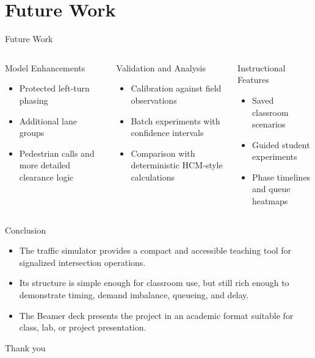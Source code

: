 \documentclass[aspectratio=169]{beamer}
\begin{document}
\section{Future Work}
\begin{frame}{Future Work}
  \begin{columns}[T,totalwidth=\textwidth]
    \begin{block}{Model Enhancements}
      \begin{itemize}
        \item Protected left-turn phasing
        \item Additional lane groups
        \item Pedestrian calls and more detailed clearance logic
      \end{itemize}
    \end{block}

    \begin{block}{Validation and Analysis}
      \begin{itemize}
        \item Calibration against field observations
        \item Batch experiments with confidence intervals
        \item Comparison with deterministic HCM-style calculations
      \end{itemize}
    \end{block}

    \begin{block}{Instructional Features}
      \begin{itemize}
        \item Saved classroom scenarios
        \item Guided student experiments
        \item Phase timelines and queue heatmaps
      \end{itemize}
    \end{block}
  \end{columns}
\end{frame}

\begin{frame}{Conclusion}
  \begin{itemize}
    \item The traffic simulator provides a compact and accessible teaching tool for signalized intersection operations.
    \item Its structure is simple enough for classroom use, but still rich enough to demonstrate timing, demand imbalance, queueing, and delay.
    \item The Beamer deck presents the project in an academic format suitable for class, lab, or project presentation.
  \end{itemize}

  \vfill
  \centering
  {\Large Thank you}
\end{frame}
\end{document}
